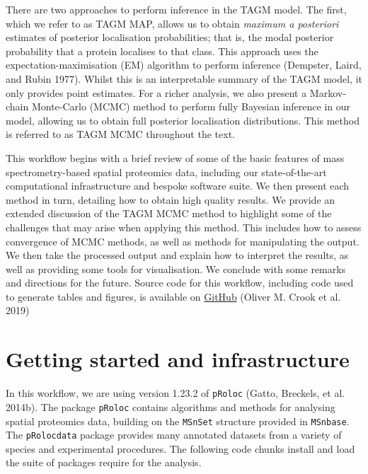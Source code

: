 \documentclass[
]{article}
\begin{document}
There are two approaches to perform inference in the TAGM model. The
first, which we refer to as TAGM MAP, allows us to obtain \emph{maximum
a posteriori} estimates of posterior localisation probabilities; that
is, the modal posterior probability that a protein localises to that
class. This approach uses the expectation-maximisation (EM) algorithm to
perform inference (Dempster, Laird, and Rubin 1977). Whilst this is an
interpretable summary of the TAGM model, it only provides point
estimates. For a richer analysis, we also present a Markov-chain
Monte-Carlo (MCMC) method to perform fully Bayesian inference in our
model, allowing us to obtain full posterior localisation distributions.
This method is referred to as TAGM MCMC throughout the text.

This workflow begins with a brief review of some of the basic features
of mass spectrometry-based spatial proteomics data, including our
state-of-the-art computational infrastructure and bespoke software
suite. We then present each method in turn, detailing how to obtain high
quality results. We provide an extended discussion of the TAGM MCMC
method to highlight some of the challenges that may arise when applying
this method. This includes how to assess convergence of MCMC methods, as
well as methods for manipulating the output. We then take the processed
output and explain how to interpret the results, as well as providing
some tools for visualisation. We conclude with some remarks and
directions for the future. Source code for this workflow, including code
used to generate tables and figures, is available on
\href{https://github.com/ococrook/TAGMworkflow}{GitHub} (Oliver M. Crook
et al. 2019)

\hypertarget{getting-started-and-infrastructure}{%
\section{Getting started and
infrastructure}\label{getting-started-and-infrastructure}}

In this workflow, we are using version 1.23.2 of \texttt{pRoloc} (Gatto,
Breckels, et al. 2014b). The package \texttt{pRoloc} contains algorithms
and methods for analysing spatial proteomics data, building on the
\texttt{MSnSet} structure provided in \texttt{MSnbase}. The
\texttt{pRolocdata} package provides many annotated datasets from a
variety of species and experimental procedures. The following code
chunks install and load the suite of packages require for the analysis.
\end{document}
